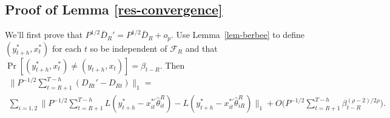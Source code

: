 \documentclass[11pt]{article}
\begin{document}
\subsection*{Proof of Lemma \ref{res-convergence}}
\newcommand{\resConvgRHS}[1]{\ensuremath{\E(L(y^* - x_1^{*\prime}\bh{1#1}) - L(y^{*} -
x_2^{*\prime}\bh{2#1}) \mid \bh{#1})}}
\newcommand{\resConvgEstDiff}[1]{\ensuremath{\E(L(y^{*} -
    x_{#1}^{*\prime}\bh{#1R}) \mid \bh{R}) - 
\E(L(y^{*} - x_{#1}^{*\prime}\bh{#1T}) \mid \bh{T})}}
\newcommand{\resConvgEstDiffRV}[1]{\ensuremath{L(y^{*} -
    x_{#1}^{*\prime}\bh{#1R}) - L(y^{*} - x_{#1}^{*\prime}\bh{#1T})}}
We'll first prove that $P^{1/2} \bar{D}_R' = P^{1/2} \bar{D}_R + o_p$.
Use Lemma~\ref{lem-berbee} to define $(y_{t+h}^{*}, x_{t}^{*})$ for
each $t$ so be independent of $\mathcal{F}_R$ and that
$\Pr[(y_{t+h}^{*}, x_{t}^{*}) \neq (y_{t+h}, x_t)] = \beta_{t-R}$.
Then
\begin{multline*}
  \Big\| P^{-1/2} \sum_{t=R+1}^{T-h} (D_{Rt}' - D_{Rt}) \Big\|_1 = \\
  \sum_{i=1,2} \Big\| P^{-1/2} \sum_{t=R+1}^{T-h} L(y_{t+h}^{*} -
  x_{it}^{*\prime} \hat{\theta}_{it}^R) - L(y_{t+h}^{*} -
  x_{it}^{*\prime} \hat{\theta}_{iR}^R) \Big\|_1  + O\Big(P^{-1/2}
  \sum_{t=R+1}^{T-h} \beta_{t-R}^{(\rho-2)/2\rho}\Big).
\end{multline*}
\end{document}
